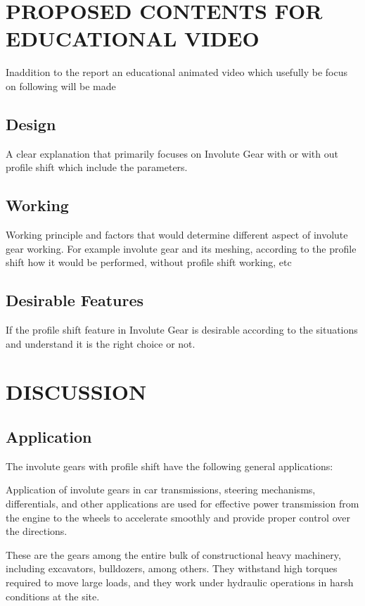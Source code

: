 \documentclass{article}
\begin{document}
\section{PROPOSED CONTENTS FOR EDUCATIONAL VIDEO}
Inaddition to the report an educational animated video which usefully be focus on following will be made

\subsection{Design}
A clear explanation that primarily focuses on Involute Gear with or with out profile shift which include the parameters.

\subsection{Working}
Working principle and factors that would determine different aspect of  involute gear working. For example involute gear and its meshing, according to the profile shift how it would be performed, without profile shift working, etc

\subsection{Desirable Features} 
If the profile shift feature in Involute Gear is desirable according to the situations and understand it is the right choice or not.
\newpage

\section{DISCUSSION}
\subsection{Application}
The involute gears with profile shift have the following general applications:

Application of involute gears in car transmissions, steering mechanisms, differentials, and other applications are used for effective power transmission from the engine to the wheels to accelerate smoothly and provide proper control over the directions.

These are the gears among the entire bulk of constructional heavy machinery, including excavators, bulldozers, among others. They withstand high torques required to move large loads, and they work under hydraulic operations in harsh conditions at the site.
\end{document}
